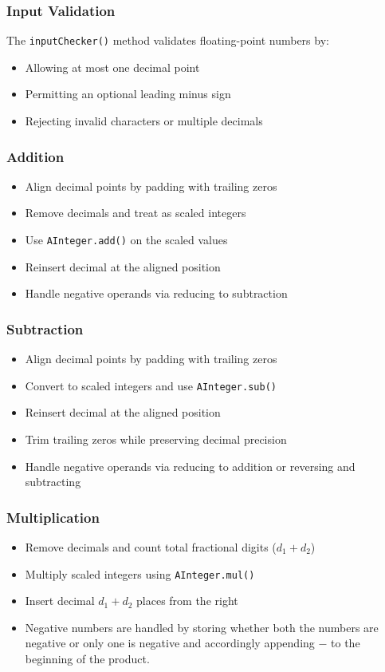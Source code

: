 \documentclass[12pt]{article}
\begin{document}
\subsubsection{Input Validation}
The \texttt{inputChecker()} method validates floating-point numbers by:
\begin{itemize}
    \item Allowing at most one decimal point
    \item Permitting an optional leading minus sign
    \item Rejecting invalid characters or multiple decimals
\end{itemize}

\subsubsection{Addition}
\begin{itemize}
    \item Align decimal points by padding with trailing zeros
    \item Remove decimals and treat as scaled integers
    \item Use \texttt{AInteger.add()} on the scaled values
    \item Reinsert decimal at the aligned position
    \item Handle negative operands via reducing to subtraction
\end{itemize}

\subsubsection{Subtraction}
\begin{itemize}
    \item Align decimal points by padding with trailing zeros
    \item Convert to scaled integers and use \texttt{AInteger.sub()}
    \item Reinsert decimal at the aligned position
    \item Trim trailing zeros while preserving decimal precision
    \item Handle negative operands via reducing to addition or reversing and subtracting
\end{itemize}

\subsubsection{Multiplication}
\begin{itemize}
    \item Remove decimals and count total fractional digits (\(d_1 + d_2\))
    \item Multiply scaled integers using \texttt{AInteger.mul()}
    \item Insert decimal \(d_1 + d_2\) places from the right
    \item Negative numbers are handled by storing whether both the numbers are negative or only one is negative and accordingly appending $-$ to the beginning of the product.
\end{itemize}
\end{document}
